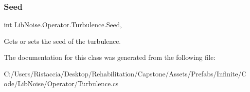 \subsubsection{\texorpdfstring{Seed}{Seed}}
{\footnotesize\ttfamily int Lib\+Noise.\+Operator.\+Turbulence.\+Seed\hspace{0.3cm}{\ttfamily [get]}, {\ttfamily [set]}}



Gets or sets the seed of the turbulence. 



The documentation for this class was generated from the following file\+:\begin{DoxyCompactItemize}
\item 
C\+:/\+Users/\+Ristaccia/\+Desktop/\+Rehabilitation/\+Capstone/\+Assets/\+Prefabs/\+Infinite/\+Code/\+Lib\+Noise/\+Operator/Turbulence.\+cs\end{DoxyCompactItemize}
